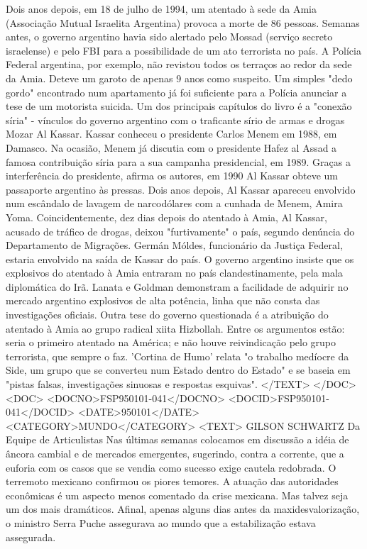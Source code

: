 Dois anos depois, em 18 de julho de 1994, um atentado à sede da Amia (Associação Mutual Israelita Argentina) provoca a morte de 86 pessoas.
Semanas antes, o governo argentino havia sido alertado pelo Mossad (serviço secreto israelense) e pelo FBI para a possibilidade de um ato terrorista no país.
A Polícia Federal argentina, por exemplo, não revistou todos os terraços ao redor da sede da Amia. Deteve um garoto de apenas 9 anos como suspeito.
Um simples "dedo gordo" encontrado num apartamento já foi suficiente para a Polícia anunciar a tese de um motorista suicida.
Um dos principais capítulos do livro é a "conexão síria" - vínculos do governo argentino com o traficante sírio de armas e drogas Mozar Al Kassar. Kassar conheceu o presidente Carlos Menem em 1988, em Damasco.
Na ocasião, Menem já discutia com o presidente Hafez al Assad a famosa contribuição síria para a sua campanha presidencial, em 1989. Graças a interferência do presidente, afirma os autores, em 1990 Al Kassar obteve um passaporte argentino às pressas.
Dois anos depois, Al Kassar apareceu envolvido num escândalo de lavagem de narcodólares com a cunhada de Menem, Amira Yoma. Coincidentemente, dez dias depois do atentado à Amia, Al Kassar, acusado de tráfico de drogas, deixou "furtivamente" o país, segundo denúncia do Departamento de Migrações.
Germán Móldes, funcionário da Justiça Federal, estaria envolvido na saída de Kassar do país.
O governo argentino insiste que os explosivos do atentado à Amia entraram no país clandestinamente, pela mala diplomática do Irã. Lanata e Goldman demonstram a facilidade de adquirir no mercado argentino explosivos de alta potência, linha que não consta das investigações oficiais.
Outra tese do governo questionada é a atribuição do atentado à Amia ao grupo radical xiita Hizbollah. Entre os argumentos estão: seria o primeiro atentado na América; e não houve reivindicação pelo grupo terrorista, que sempre o faz.
'Cortina de Humo' relata "o trabalho medíocre da Side, um grupo que se converteu num Estado dentro do Estado" e se baseia em "pistas falsas, investigações sinuosas e respostas esquivas".
</TEXT>
</DOC>
<DOC>
<DOCNO>FSP950101-041</DOCNO>
<DOCID>FSP950101-041</DOCID>
<DATE>950101</DATE>
<CATEGORY>MUNDO</CATEGORY>
<TEXT>
GILSON SCHWARTZ 
Da Equipe de Articulistas 
Nas últimas semanas colocamos em discussão a idéia de âncora cambial e de mercados emergentes, sugerindo, contra a corrente, que a euforia com os casos que se vendia como sucesso exige cautela redobrada. O terremoto mexicano confirmou os piores temores.
A atuação das autoridades econômicas é um aspecto menos comentado da crise mexicana. Mas talvez seja um dos mais dramáticos. Afinal, apenas alguns dias antes da maxidesvalorização, o ministro Serra Puche assegurava ao mundo que a estabilização estava assegurada.
